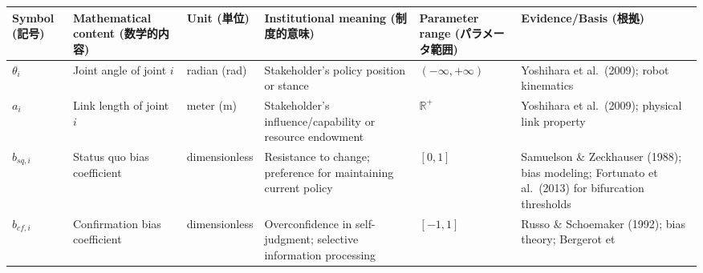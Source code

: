 {\def\LTcaptype{none} %
\begin{longtable}[]{@{}
  >{\raggedright\arraybackslash}p{}
  >{\raggedright\arraybackslash}p{}
  >{\raggedright\arraybackslash}p{}
  >{\raggedright\arraybackslash}p{}
  >{\raggedright\arraybackslash}p{}
  >{\raggedright\arraybackslash}p{}@{}}
\toprule\noalign{}
\begin{minipage}[b]{\linewidth}\raggedright
Symbol (記号)
\end{minipage} & \begin{minipage}[b]{\linewidth}\raggedright
Mathematical content (数学的内容)
\end{minipage} & \begin{minipage}[b]{\linewidth}\raggedright
Unit (単位)
\end{minipage} & \begin{minipage}[b]{\linewidth}\raggedright
Institutional meaning (制度的意味)
\end{minipage} & \begin{minipage}[b]{\linewidth}\raggedright
Parameter range (パラメータ範囲)
\end{minipage} & \begin{minipage}[b]{\linewidth}\raggedright
Evidence/Basis (根拠)
\end{minipage} \\
\midrule\noalign{}
\endhead
\bottomrule\noalign{}
\endlastfoot
\(\theta_i\) & Joint angle of joint \(i\) & radian (rad) & Stakeholder's
policy position or stance & \((-\infty, +\infty)\) & Yoshihara et
al.~(2009); robot kinematics \\
\(a_i\) & Link length of joint \(i\) & meter (m) & Stakeholder's
influence/capability or resource endowment & \(\mathbb{R}^+\) &
Yoshihara et al.~(2009); physical link property \\
\(b_{sq,i}\) & Status quo bias coefficient & dimensionless & Resistance
to change; preference for maintaining current policy & \([0, 1]\) &
Samuelson \& Zeckhauser (1988); bias modeling; Fortunato et al.~(2013)
for bifurcation thresholds \\
\(b_{cf,i}\) & Confirmation bias coefficient & dimensionless &
Overconfidence in self-judgment; selective information processing &
\([-1, 1]\) & Russo \& Schoemaker (1992); bias theory; Bergerot et

\end{longtable}}
